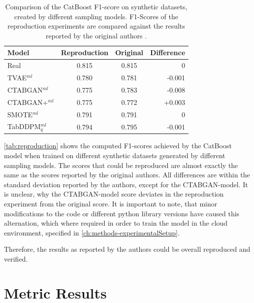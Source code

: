 \begin{table}[h]
	\centering
	\begin{tabular}{l|c|c|r}
		\hline
		\textbf{Model}     & \textbf{Reproduction} & \textbf{Original} & \textbf{Difference} \\ \hline
		Real               & 0.815                 & 0.815             & 0                   \\ \hline
		TVAE$^{ml}$        & 0.780                 & 0.781             & -0.001              \\ \hline
		CTABGAN$^{ml}$     & 0.775                 & 0.783             & -0.008              \\ \hline
		CTABGAN+$^{ml}$    & 0.775                 & 0.772             & +0.003              \\ \hline
		SMOTE$^{ml}$       & 0.791                 & 0.791             & 0                   \\ \hline
		TabDDPM$^{ml}_{q}$ & 0.794                 & 0.795             & -0.001              \\ \hline
	\end{tabular}
	\caption[Reproduction of original Results]{Comparison of the CatBoost F1-score on synthetic datasets, created by different sampling models.
		F1-Scores of the reproduction experiments are compared against the results reported by the original authors \cite[Table 4, p. 8]{kotelnikov2022TabDDPMModellingTabular}.}
	\label{tab:reproduction}
\end{table}

\autoref{tab:reproduction} shows the computed F1-scores achieved by the CatBoost model when trained on different synthetic datasets generated by different sampling models.
The scores that could be reproduced are almost exactly the same as the scores reported by the original authors.
All differences are within the standard deviation reported by the authors, except for the CTABGAN-model.
It is unclear, why the CTABGAN-model score deviates in the reproduction experiment from the original score.
It is important to note, that minor modifications to the code or different python library versions have caused this alternation, which where required in order to train the model in the cloud environment, specified in \autoref{ch:methods-experimentalSetup}.

Therefore, the results as reported by the authors could be overall reproduced and verified.

\section{Metric Results}
\label{ch:results-Metric-results}

